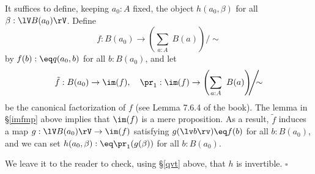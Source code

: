 \documentclass[12pt]{article}
\begin{document}
It suffices to define, keeping $a_0:A$ fixed, the object $h(a_0,\beta)$ for all $\beta:\lV B(a_0)\rV$. Define 
$$
f:B(a_0)\to\left(\sum_{a:A}\ B(a)\right)\!\!\!\Bigg/\!\!\!\!\sim
$$ 
by $f(b):\eq q(a_0,b)$ for all $b:B(a_0)$, and let 
$$
\tilde f:B(a_0)\to\im(f),\quad\pr_1:\im(f)\to\left(\sum_{a:A}\ B(a)\right)\!\!\!\Bigg/\!\!\!\!\sim
$$ 
be the canonical factorization of $f$ (see Lemma 7.6.4 of the book). The lemma in \S\ref{imfmp} above implies that $\im(f)$ is a mere proposition. As a result, $\tilde f$ induces a map $g:\lV B(a_0)\rV\to\im(f)$ satisfying $g(\lv b\rv)\eq f(b)$ for all $b:B(a_0)$, and we can set $h(a_0,\beta):\eq\pr_1(g(\beta))$ for all $b:B(a_0)$.

We leave it to the reader to check, using \S\ref{qvt} above, that $h$ is invertible. $\square$

\begin{comment}

This is about the sentence ``The obvious candidate for the coequalizer of the kernel pair of $f:A\to B$ is the image of f, as defined in \S7.6'' a few paragraphs before Lemma 10.1.1. (It's clear from the context that $A$ and $B$ are sets.) Let's show that this obvious candidate is the good one. It suffices to prove the statement

Let $A$ and $B$ be sets, let $f:A\to B$ be a surjection, define the equivalence relation $\sim$ on $A$ by 
$$
a\sim a'\text{ if and only if }f(a)=f(a'),
$$
let $A/\!\!\sim$ be the quotient as defined at the beginning of \S6.10, and let $q:A\to A/\!\!\sim$ be the canonical projection. Then there is a map $g:B\to A/\!\!\sim$ such that $g\ci f=q$:
$$
\xymatrix{
&A\ar[dl]_f\ar[dr]^q\\
B\ar[rr]_g&&A/\!\!\sim.}
$$ 

Proof. Given $b:B$ we define the sets and maps 
$$
\xymatrix{
\fib_f(b)\ar[rr]^{\pr_1}\ar[d]_{\lv-\rv}\ar[dr]^{q_b}&&A\ar[d]^q\\ 
\lV\fib_f(b)\rV\ar[r]_h&\fib_f(b)/\!\!\sim_b\ar[r]_{\ \ k}&A/\!\!\sim}
$$ 
as follows: Let $\sim_b$ be the equivalence relation defined on $\fib_f(b)$ by the requirement that $x\sim_b y$ for all $x,y:\fib_f(b)$, and $q_b$ the canonical projection; and note that $q_b$ induces $h$ and that $q\ci\pr_1$ induces $k$. The above diagram having been constructed, we set $g(b):\eq k(h(x))$, with $x:\lV\fib_f(b)\rV$. The equality $g\ci f=q$ is easily checked. $\square$

\end{comment}

\end{document}
